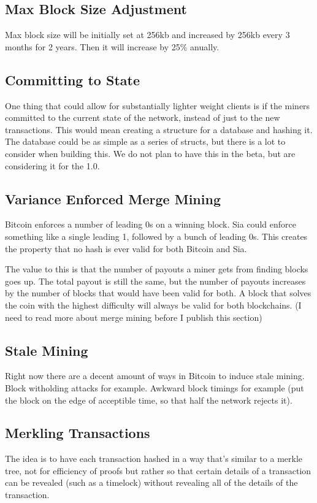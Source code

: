 \documentclass[twocolumn]{article}
\begin{document}
\subsection{Max Block Size Adjustment}
Max block size will be initially set at 256kb and increased by 256kb every 3 months for 2 years.
Then it will increase by 25\% anually.

\subsection{Committing to State}
One thing that could allow for substantially lighter weight clients is if the miners committed to the current state of the network, instead of just to the new transactions.
This would mean creating a structure for a database and hashing it.
The database could be as simple as a series of structs, but there is a lot to consider when building this.
We do not plan to have this in the beta, but are considering it for the 1.0.

\subsection{Variance Enforced Merge Mining}
Bitcoin enforces a number of leading 0s on a winning block.
Sia could enforce something like a single leading 1, followed by a bunch of leading 0s.
This creates the property that no hash is ever valid for both Bitcoin and Sia.

The value to this is that the number of payouts a miner gets from finding blocks goes up.
The total payout is still the same, but the number of payouts increases by the number of blocks that would have been valid for both.
A block that solves the coin with the highest difficulty will always be valid for both blockchains.
(I need to read more about merge mining before I publish this section)

\subsection{Stale Mining}
Right now there are a decent amount of ways in Bitcoin to induce stale mining.
Block witholding attacks for example.
Awkward block timings for example (put the block on the edge of acceptible time, so that half the network rejects it).

\subsection{Merkling Transactions}
The idea is to have each transaction hashed in a way that's similar to a merkle tree, not for efficiency of proofs but rather so that certain details of a transaction can be revealed (such as a timelock) without revealing all of the details of the transaction.
\end{document}
